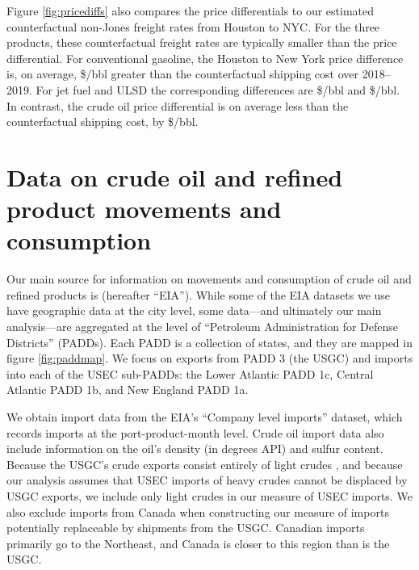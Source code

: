 \documentclass[12pt]{article}
\begin{document}
Figure \ref{fig:pricediffs} also compares the price differentials to our estimated counterfactual non-Jones freight rates from Houston to NYC. For the three products, these counterfactual freight rates are typically smaller than the price differential. For conventional gasoline, the Houston to New York price difference is, on average, \$\unskip/bbl greater than the counterfactual shipping cost over 2018--2019. For jet fuel and ULSD the corresponding differences are \$\unskip/bbl and  \$\unskip/bbl. In contrast, the crude oil price differential is on average less than the counterfactual shipping cost, by \$\unskip/bbl.




\section{Data on crude oil and refined product movements and consumption \label{sec:flowdata}}

Our main source for information on movements and consumption of crude oil and refined products is \citet{EIApetroleum} (hereafter ``EIA''). While some of the EIA datasets we use have geographic data at the city level, some data---and ultimately our main analysis---are aggregated at the level of ``Petroleum Administration for Defense Districts'' (PADDs). Each PADD is a collection of states, and they are mapped in figure \ref{fig:paddmap}. We focus on exports from PADD 3 (the USGC) and imports into each of the USEC sub-PADDs: the Lower Atlantic PADD 1c, Central Atlantic PADD 1b, and New England PADD 1a.

We obtain import data from the EIA's ``Company level imports'' dataset, which records imports at the port-product-month level. Crude oil import data also include information on the oil's density (in degrees API) and sulfur content. Because the USGC's crude exports consist entirely of light crudes \citep{SPglobal_exports_2018}, and because our analysis assumes that USEC imports of heavy crudes cannot be displaced by USGC exports, we include only light crudes in our measure of USEC imports. We also exclude imports from Canada when constructing our measure of imports potentially replaceable by shipments from the USGC. Canadian imports primarily go to the Northeast, and Canada is closer to this region than is the USGC. 
\end{document}
